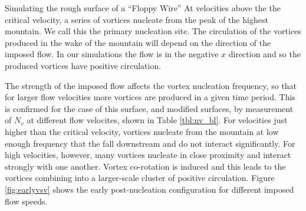 \begin{chapter}{\label{cha:afm}Simulating the rough surface of a ``Floppy Wire''}
At velocities above the the critical velocity, a series of vortices nucleate from the peak of the highest mountain. We call this the primary nucleation site. The circulation of the vortices produced in the wake of the mountain will depend on the direction of the imposed flow. In our simulations the flow is in the negative $x$ direction and so the produced vortices have positive circulation.

The strength of the imposed flow affects the vortex nucleation frequency, so that for larger flow velocities more vortices are produced in a given time period. This is confirmed for the case of this surface, and modified surfaces, by measurement of $N_v$ at different flow velocites, shown in Table \ref{tbl:nv_bl}. For velocities just higher than the critical velocity, vortices nucleate from the mountain at low enough frequency that the fall downstream and do not interact significantly. For high velocities, however, many vortices nucleate in close proximity and interact strongly with one another. Vortex co-rotation is induced and this leads to the vortices combining into a larger-scale cluster of positive circulation. Figure \ref{fig:earlyvsv} shows the early post-nucleation configuration for different imposed flow speeds. 


\end{chapter}
